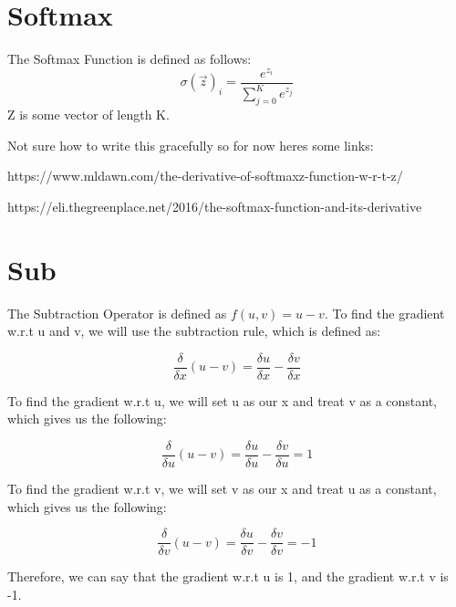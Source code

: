 \documentclass{article}
\begin{document}
\noindent\makebox[\linewidth]{\rule{\paperwidth}{0.4pt}}
    \section{Softmax}
        The Softmax Function is defined as follows:
        $$\sigma(\vec z)_i = \frac{e^{z_i}}{\sum_{j=0}^{K} e^{z_j}}$$
        Z is some vector of length K. 

        Not sure how to write this gracefully so for now heres some links:

        https://www.mldawn.com/the-derivative-of-softmaxz-function-w-r-t-z/
        
        https://eli.thegreenplace.net/2016/the-softmax-function-and-its-derivative

\noindent\makebox[\linewidth]{\rule{\paperwidth}{0.4pt}}  
    \section{Sub}
        The Subtraction Operator is defined as $f(u,v) = u - v$. To find the gradient w.r.t u and v, 
        we will use the subtraction rule, which is defined as: 
    
        $$\frac{\delta}{\delta{x}}(u - v) = \frac{\delta{u}}{\delta{x}} - \frac{\delta{v}}{\delta{x}}$$
    
        To find the gradient w.r.t u, we will set u as our x and treat v as a constant, 
        which gives us the following:
    
        $$\frac{\delta}{\delta{u}}(u - v) = \frac{\delta{u}}{\delta{u}} - \frac{\delta{v}}{\delta{u}} = 1$$
    
        To find the gradient w.r.t v, we will set v as our x and treat u as a constant, 
        which gives us the following:
    
        $$\frac{\delta}{\delta{v}}(u - v) = \frac{\delta{u}}{\delta{v}} - \frac{\delta{v}}{\delta{v}} = -1$$
    
        Therefore, we can say that the gradient w.r.t u is 1, and the gradient w.r.t v is -1. 
\end{document}
